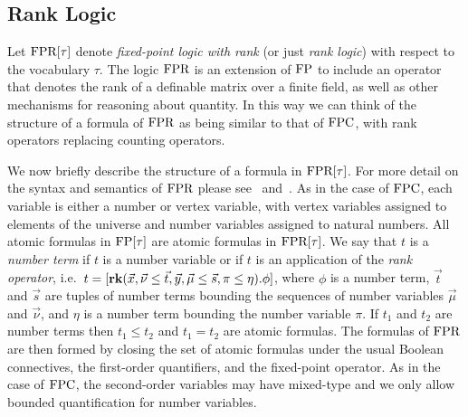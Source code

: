 \documentclass[../paper.tex]{subfiles}
\begin{document}

\subsection{Rank Logic}
Let $\text{\upshape FPR}[\tau]$ denote \emph{fixed-point logic with rank} (or just \emph{rank
  logic}) with respect to the vocabulary $\tau$. The logic $\text{\upshape FPR}$ is an
extension of $\text{\upshape FP}$ to include an operator that denotes the rank of a definable
matrix over a finite field, as well as other mechanisms for reasoning about
quantity. In this way we can think of the structure of a formula of $\text{\upshape FPR}$ as
being similar to that of $\text{\upshape FPC}$, with rank operators replacing counting
operators.

We now briefly describe the structure of a formula in $\text{\upshape FPR}[\tau]$. For more
detail on the syntax and semantics of $\text{\upshape FPR}$ please see~\cite{GradelP15a}
and~\cite{Dawar09logicswith}. As in the case of $\text{\upshape FPC}$, each variable is either
a number or vertex variable, with vertex variables assigned to elements of the
universe and number variables assigned to natural numbers. All atomic formulas
in $\text{\upshape FP}[\tau]$ are atomic formulas in $\text{\upshape FPR}[\tau]$. We say that $t$ is a
\emph{number term} if $t$ is a number variable or if $t$ is an application of
the \emph{rank operator}, i.e.\ $t = [\text{\textbf{rk}} (\vec{x}, \vec {\nu} \leq \vec{t},
\vec{y},\vec{\mu} \leq \vec{s}, \pi \leq \eta). \phi]$, where $\phi$ is a number
term, $\vec{t}$ and $\vec{s}$ are tuples of number terms bounding the sequences
of number variables $\vec{\mu}$ and $\vec{\nu}$, and $\eta$ is a number term
bounding the number variable $\pi$. If $t_1$ and $t_2$ are number terms then
$t_1 \leq t_2$ and $t_1 = t_2$ are atomic formulas. The formulas of $\text{\upshape FPR}$ are
then formed by closing the set of atomic formulas under the usual Boolean
connectives, the first-order quantifiers, and the fixed-point operator. As in
the case of $\text{\upshape FPC}$, the second-order variables may have mixed-type and we only
allow bounded quantification for number variables. 
\end{document}
